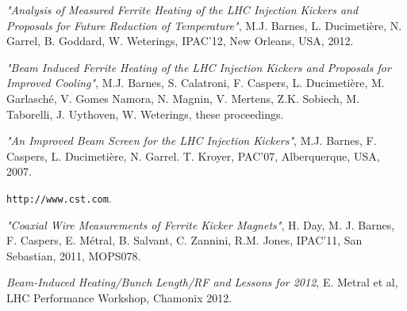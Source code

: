 \documentclass{JAC2003}
\begin{document}
\begin{thebibliography}{9}

\emph{"Analysis of Measured Ferrite Heating of the LHC Injection Kickers and Proposals for Future Reduction of Temperature"}, M.J. Barnes, L. Ducimetière, N. Garrel, B. Goddard, W. Weterings, IPAC'12, New Orleans, USA, 2012.

\emph{"Beam Induced Ferrite Heating of the LHC Injection Kickers and Proposals for Improved Cooling"}, M.J. Barnes, S. Calatroni, F. Caspers, L. Ducimetière, M. Garlasché, V. Gomes Namora, N. Magnin, V. Mertens, Z.K. Sobiech, M. Taborelli, J. Uythoven, W. Weterings, these proceedings.

\emph{"An Improved Beam Screen for the LHC Injection Kickers"}, M.J. Barnes, F. Caspers, L. Ducimetière, N. Garrel. T. Kroyer, PAC'07, Alberquerque, USA, 2007.

\texttt{http://www.cst.com}.

\emph{"Coaxial Wire Measurements of Ferrite Kicker Magnets"}, H. Day, M. J. Barnes, F. Caspers, E. Métral, B. Salvant, C. Zannini, R.M. Jones, IPAC'11, San Sebastian, 2011, MOPS078.

\emph{Beam-Induced Heating/Bunch Length/RF and Lessons for 2012}, E. Metral et al, LHC Performance Workshop, Chamonix 2012. 


\end{thebibliography}
\end{document}

